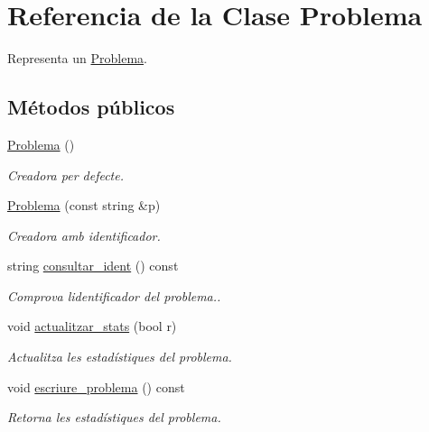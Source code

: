 \hypertarget{class_problema}{}\section{Referencia de la Clase Problema}
\label{class_problema}


Representa un \mbox{\hyperlink{class_problema}{Problema}}.  


\subsection*{Métodos públicos}
\begin{DoxyCompactItemize}
\item 
\mbox{\hyperlink{class_problema_a9d81af5f3f42a1b4354ad8f3c022fca3}{Problema}} ()
\begin{DoxyCompactList}\small\item\em Creadora per defecte. \end{DoxyCompactList}\item 
\mbox{\hyperlink{class_problema_a1e324e71f69700442f8740f5720c983a}{Problema}} (const string \&p)
\begin{DoxyCompactList}\small\item\em Creadora amb identificador. \end{DoxyCompactList}\item 
string \mbox{\hyperlink{class_problema_ad2221cdbaf6ddcf353f6a94e52c6256a}{consultar\+\_\+ident}} () const
\begin{DoxyCompactList}\small\item\em Comprova l\textquotesingle{}identificador del problema.. \end{DoxyCompactList}\item 
void \mbox{\hyperlink{class_problema_a769d7920810acf042cdd6aa9c3236a0c}{actualitzar\+\_\+stats}} (bool r)
\begin{DoxyCompactList}\small\item\em Actualitza les estadístiques del problema. \end{DoxyCompactList}\item 
void \mbox{\hyperlink{class_problema_a6faae2ee8a1812951b22565cc234e8a4}{escriure\+\_\+problema}} () const
\begin{DoxyCompactList}\small\item\em Retorna les estadístiques del problema. \end{DoxyCompactList}\end{DoxyCompactItemize}


